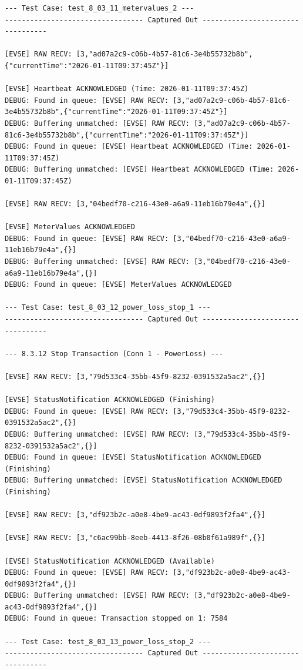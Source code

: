 \documentclass{article}
\begin{document}
\begin{lstlisting}
--- Test Case: test_8_03_11_metervalues_2 ---
--------------------------------- Captured Out ---------------------------------

[EVSE] RAW RECV: [3,"ad07a2c9-c06b-4b57-81c6-3e4b55732b8b",{"currentTime":"2026-01-11T09:37:45Z"}]

[EVSE] Heartbeat ACKNOWLEDGED (Time: 2026-01-11T09:37:45Z)
DEBUG: Found in queue: [EVSE] RAW RECV: [3,"ad07a2c9-c06b-4b57-81c6-3e4b55732b8b",{"currentTime":"2026-01-11T09:37:45Z"}]
DEBUG: Buffering unmatched: [EVSE] RAW RECV: [3,"ad07a2c9-c06b-4b57-81c6-3e4b55732b8b",{"currentTime":"2026-01-11T09:37:45Z"}]
DEBUG: Found in queue: [EVSE] Heartbeat ACKNOWLEDGED (Time: 2026-01-11T09:37:45Z)
DEBUG: Buffering unmatched: [EVSE] Heartbeat ACKNOWLEDGED (Time: 2026-01-11T09:37:45Z)

[EVSE] RAW RECV: [3,"04bedf70-c216-43e0-a6a9-11eb16b79e4a",{}]

[EVSE] MeterValues ACKNOWLEDGED
DEBUG: Found in queue: [EVSE] RAW RECV: [3,"04bedf70-c216-43e0-a6a9-11eb16b79e4a",{}]
DEBUG: Buffering unmatched: [EVSE] RAW RECV: [3,"04bedf70-c216-43e0-a6a9-11eb16b79e4a",{}]
DEBUG: Found in queue: [EVSE] MeterValues ACKNOWLEDGED

--- Test Case: test_8_03_12_power_loss_stop_1 ---
--------------------------------- Captured Out ---------------------------------

--- 8.3.12 Stop Transaction (Conn 1 - PowerLoss) ---

[EVSE] RAW RECV: [3,"79d533c4-35bb-45f9-8232-0391532a5ac2",{}]

[EVSE] StatusNotification ACKNOWLEDGED (Finishing)
DEBUG: Found in queue: [EVSE] RAW RECV: [3,"79d533c4-35bb-45f9-8232-0391532a5ac2",{}]
DEBUG: Buffering unmatched: [EVSE] RAW RECV: [3,"79d533c4-35bb-45f9-8232-0391532a5ac2",{}]
DEBUG: Found in queue: [EVSE] StatusNotification ACKNOWLEDGED (Finishing)
DEBUG: Buffering unmatched: [EVSE] StatusNotification ACKNOWLEDGED (Finishing)

[EVSE] RAW RECV: [3,"df923b2c-a0e8-4be9-ac43-0df9893f2fa4",{}]

[EVSE] RAW RECV: [3,"c6ac99bb-8eeb-4413-8f26-08b0f61a989f",{}]

[EVSE] StatusNotification ACKNOWLEDGED (Available)
DEBUG: Found in queue: [EVSE] RAW RECV: [3,"df923b2c-a0e8-4be9-ac43-0df9893f2fa4",{}]
DEBUG: Buffering unmatched: [EVSE] RAW RECV: [3,"df923b2c-a0e8-4be9-ac43-0df9893f2fa4",{}]
DEBUG: Found in queue: Transaction stopped on 1: 7584

--- Test Case: test_8_03_13_power_loss_stop_2 ---
--------------------------------- Captured Out ---------------------------------


\end{lstlisting}
\end{document}
